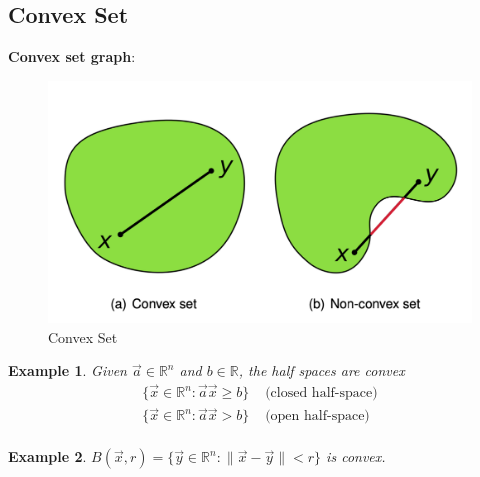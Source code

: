 \documentclass[11pt,a4paper]{article}
\newtheorem{example}{Example}
\begin{document}
\subsection{Convex Set}
\begin{center}
\end{center}
\textbf{Convex set graph}:
\begin{center}\begin{figure}[htbp]
    \centering
    \includegraphics[scale=0.3]{Convex_set.png}
    \caption{Convex Set}
    \label{}
\end{figure}\end{center}

\begin{example}
Given $\vec{a}\in \mathbb{R}^n$ and $b\in \mathbb{R}$, the half spaces are convex
\begin{equation}
    \begin{aligned}
        \{\vec{x}\in \mathbb{R}^n: \vec{a}\vec{x}\geq b\}&\text{ (closed half-space)}\\
        \{\vec{x}\in \mathbb{R}^n: \vec{a}\vec{x}> b\}&\text{ (open half-space)}\\
    \end{aligned}
    \nonumber
\end{equation}
\end{example}

\begin{example}
$B(\vec{x},r)=\{\vec{y}\in \mathbb{R}^n:\|\vec{x}-\vec{y}\|< r\}$ is convex.
\end{example}
\end{document}
